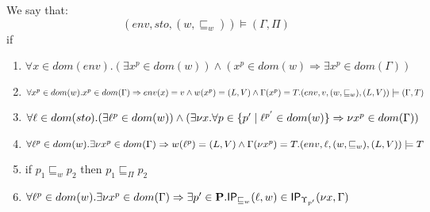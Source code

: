 \documentclass{llncs}
\newcommand{\uf}{\ensuremath{\mathsf{IP}}}
\newcommand{\sqleq}{\ensuremath{\sqsubseteq\xspace}}
\begin{document}
\begin{definition}\label{def:EnvAgree}
	We say that:
	$$(env,sto,(w,\sqleq_w))\models(\Gamma,\Pi)$$
	if 
	\begin{enumerate}
		\item \label{prop:1} $\forall x\in dom(env).(\exists x^p\in dom(w))\wedge(x^p\in dom(w)\Rightarrow \exists x^p\in dom(\Gamma))$
		\item \label{prop:2} $\forall x^p\in dom(w).x^p\in dom(\Gamma)\Rightarrow env(x)=v\wedge w(x^p)=(L,V)\wedge\Gamma(x^p)=T.\\(env,v,(w,\sqleq_w),(L,V))\models (\Gamma,T)$
		\item \label{prop:3} $\forall \ell\in dom(sto).(\exists \ell^p\in dom(w))\wedge(\exists \nu x.\forall p\in\{p'\mid\ell^{p'}\in dom(w)\}\Rightarrow\nu x^p\in dom(\Gamma))$
		\item \label{prop:4} $\forall \loc^p \in dom(w).\exists\nu x^{p}\in dom(\Gamma)\Rightarrow w(\loc^p)=(L,V)\wedge\Gamma(\nu x^{p})=T.(env,\loc,(w,\sqleq_w),(L,V))\models T$
		\item \label{prop:5} if $p_1\sqleq_w p_2$ then $p_1\sqleq_\Pi p_2$
	\item \label{prop:6} $\forall \loc^p\in dom(w).\exists \nu
          x^p\in dom(\Gamma)\Rightarrow\exists
          p'\in\cat{P}.\uf_{\sqleq_w}(\loc,w)\in
          \uf_{\Upsilon_{p'}}(\nu x,\Gamma)$ 
	\end{enumerate}
\end{definition}



\end{document}
